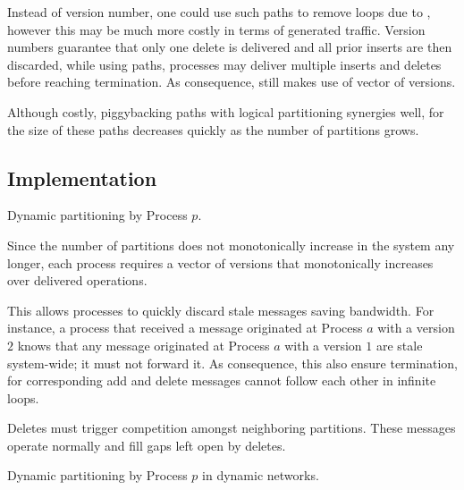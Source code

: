 \noindent Instead of version number, one could use such paths to remove loops
due to , however this may be much more costly in
terms of generated traffic. Version numbers guarantee that only one
delete is delivered and all prior inserts are then discarded, while
using paths, processes may deliver multiple inserts and deletes before
reaching termination.  As
consequence, \NAME still makes use of vector of versions.

\noindent Although costly, piggybacking paths with logical partitioning synergies
well, for the size of these paths decreases quickly as the number of
partitions grows.

\subsection{Implementation}

\begin{algorithm}
  
  \caption{\label{algo:adddelundo}Dynamic partitioning by Process $p$.}
\end{algorithm}


Since the number of partitions does not monotonically increase in the
system any longer, each process requires a vector of versions that
monotonically increases over delivered operations.

This allows processes to quickly discard stale messages saving
bandwidth. For instance, a process that received a message originated
at Process $a$ with a version $2$ knows that any message originated at
Process $a$ with a version $1$ are stale system-wide; it must not
forward it. As consequence, this also ensure termination, for
corresponding add and delete messages cannot follow each other in
infinite loops.

\noindent Deletes must trigger competition amongst neighboring
partitions. These  messages operate normally and fill gaps
left open by deletes. 


\begin{algorithm}
  
  \caption{\label{algo:edges}Dynamic partitioning by Process $p$ in dynamic networks.}
\end{algorithm}



